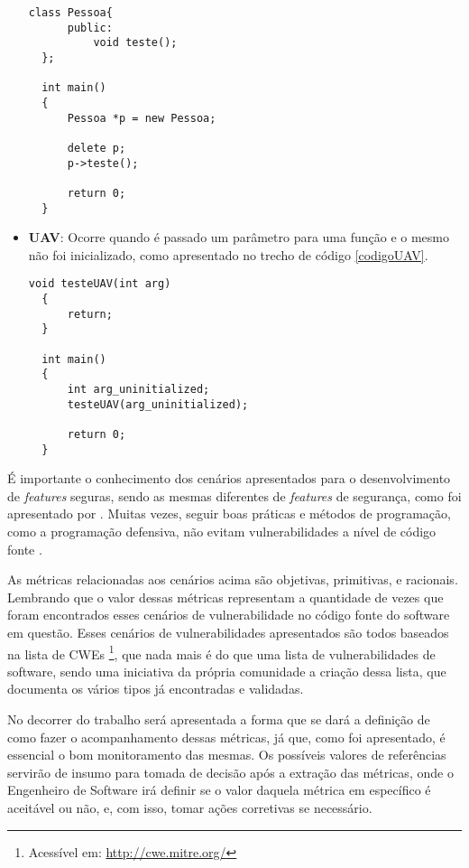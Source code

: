 \begin{itemize}
    \begin{lstlisting}[caption={Código exemplo UAF}, label=codigoUAF]
  class Pessoa{
      public:
          void teste();
  };

  int main()
  {
      Pessoa *p = new Pessoa;

      delete p;
      p->teste();

      return 0;
  }
    \end{lstlisting}
  \item \textbf{UAV}: Ocorre quando é passado um parâmetro para uma função e o mesmo não foi inicializado, como apresentado no 
    trecho de código \ref{codigoUAV}.

    \begin{lstlisting}[caption={Código exemplo UAV}, label=codigoUAV]
  void testeUAV(int arg)
  {
      return;
  }

  int main()
  {
      int arg_uninitialized;
      testeUAV(arg_uninitialized);
      
      return 0;
  }
    \end{lstlisting}
\end{itemize}


É importante o conhecimento dos cenários apresentados para o desenvolvimento de
\textit{features} seguras, sendo as mesmas diferentes de \textit{features} de
segurança, como foi apresentado por . Muitas vezes, seguir boas práticas e métodos de
programação, como a programação defensiva, não evitam vulnerabilidades a nível de código
fonte \cite{chess&west2007}.

As métricas relacionadas aos cenários acima são objetivas, primitivas, e racionais. Lembrando que o valor dessas 
métricas representam a quantidade de vezes que foram encontrados esses cenários de vulnerabilidade no código fonte do software 
em questão. Esses cenários de vulnerabilidades apresentados são todos baseados na
lista de CWEs \footnote{Acessível em: \url{http://cwe.mitre.org/}}, que nada
mais é do que uma lista de vulnerabilidades de software, sendo uma iniciativa da
própria comunidade a criação dessa lista, que documenta os vários tipos já encontradas e validadas.

No decorrer do trabalho será apresentada a forma que se dará a definição de como
fazer o acompanhamento dessas
métricas, já que, como foi apresentado, é essencial o bom monitoramento das
mesmas. Os possíveis valores de referências servirão
de insumo para tomada de decisão após a extração das métricas, onde o Engenheiro
de Software irá definir se o valor daquela
métrica em específico é aceitável ou não, e, com isso, tomar ações corretivas se necessário.

